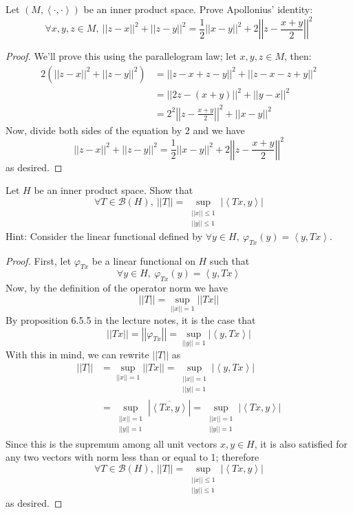 \documentclass{article}
\newcommand{\norm}[1]{\left|\left|#1\right|\right|}
\newcommand{\abs}[1]{\left|#1\right|}
\newcommand{\parens}[1]{\left(#1\right)}
\newcommand{\abracks}[1]{\left< #1\right>}
\begin{document}
    \item Let $\parens{M, \abracks{\cdot, \cdot}}$ be an inner product space. Prove 
    Apollonius' identity:
    $$\forall x,y,z \in M,\ \norm{z-x}^2 + \norm{z-y}^2 = \frac{1}{2}\norm{x-y}^2 + 
    2\norm{z - \frac{x+y}{2}}^2$$
    \begin{proof}
    We'll prove this using the parallelogram law; let 
    $x,y,z \in M$, then:
    \begin{align*}
    2\parens{\norm{z-x}^2 + \norm{z-y}^2} &= \norm{z-x+z-y}^2 + \norm{z-x-z+y}^2 \\
    &= \norm{2z-(x+y)}^2 + \norm{y-x}^2 \\
    &= 2^2\norm{z-\frac{x+y}{2}}^2 + \norm{x-y}^2 
    \end{align*}
    Now, divide both sides of the equation by $2$ and we have 
    $$\norm{z-x}^2 + \norm{z-y}^2 = \frac{1}{2}\norm{x-y}^2 + 2\norm{z - \frac{x+y}{2}}^2$$
    as desired.
    \end{proof}

    \item Let $H$ be an inner product space. Show that
    $$\forall T \in \mathcal{B}(H),\ \norm{T} = 
    \sup_{\substack{\norm{x}\leq 1 \\ \norm{y}\leq1}}\abs{\abracks{Tx, y}}$$
    Hint: Consider the linear functional defined by $\forall y \in H,\ \varphi_{Tx}(y)
    = \abracks{y, Tx}$.
    \begin{proof}
    First, let $\varphi_{Tx}$ be a linear functional on $H$ such that 
    $$\forall y \in H,\ \varphi_{Tx}(y) = \abracks{y,Tx}$$
    Now, by the definition of the operator norm we have 
    $$\norm{T} = \sup_{\norm{x} = 1} \norm{Tx}$$
    By proposition 6.5.5 in the lecture notes, it is the case that 
    $$\norm{Tx} = \norm{\varphi_{Tx}} = \sup_{\norm{y}=1}\abs{\abracks{y, Tx}}$$
    With this in mind, we can rewrite $\norm{T}$ as 
    \begin{align*}
    \norm{T} &= \sup_{\norm{x} = 1} \norm{Tx} = \sup_{\substack{\norm{x} = 1 \\
    \norm{y} = 1}}\abs{\abracks{y, Tx}} \\
    &= \sup_{\substack{\norm{x} = 1\\\norm{y} = 1}}\abs{\overline{\abracks{Tx, y}}} = 
    \sup_{\substack{\norm{x} = 1\\\norm{y} = 1}}\abs{\abracks{Tx, y}}
    \end{align*}
    Since this is the supremum among all unit vectors $x, y \in H$, it is also satisfied
    for any two vectors with norm less than or equal to 1; therefore 
    $$\forall T \in \mathcal{B}(H),\ \norm{T} = 
    \sup_{\substack{\norm{x}\leq 1 \\ \norm{y}\leq1}}\abs{\abracks{Tx, y}}$$
    as desired.
    \end{proof}
\end{document}
